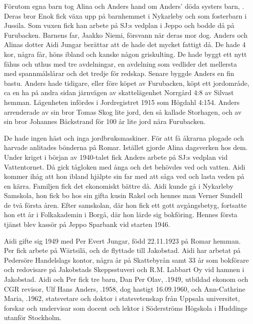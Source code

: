 Förutom egna barn tog Alina och Anders hand om Anders' döda systers barn, . Deras bror Enok fick växa upp på barnhemmet i Nykarleby och som fosterbarn i Jussila. Som vuxen fick han arbete på SJ:s vedplan i Jeppo och bodde då på Furubacken. Barnens far, Jaakko Niemi, försvann när deras mor dog. Anders och Alinas dotter Aidi Jungar berättar att de hade det mycket fattigt då. De hade 4 kor, några får, höns ibland och kanske någon griskulting. De hade byggt ett nytt fähus och uthus med tre avdelningar, en avdelning som 	vedlider det mellersta med spannmålslårar och det tredje för redskap. Senare byggde Anders en fin bastu. Anders hade tidigare, eller före köpet	av Furubacken, köpt ett jordområde, ca en ha på andra sidan järnvägen av skattelägenhet Norrgård 4:8 av Silvast hemman. Lägenheten infördes i Jordregistret 1915 som Högdahl 4:154. Anders arrenderade av sin bror Tomas Skog lite jord, den så kallade Storhagen, och av sin bror Johannes Bäckstrand för 100 år lite jord nära Furubacken.

De hade ingen häst och inga jordbruksmaskiner. För att få åkrarna plogade och harvade anlitades bönderna på Romar. Istället gjorde Alina dagsverken hos dem. Under kriget i början av 1940-talet fick Anders arbete på SJ:s vedplan vid Vattentornet. Då gick tågloken med 	ånga och det behövdes ved och vatten. Aidi kommer ihåg att hon ibland hjälpte sin far med att såga ved och lasta veden på en kärra. Familjen fick det ekonomiskt bättre då. Aidi 	kunde gå i Nykarleby Samskola, hon fick bo hos sin gifta kusin Rakel och hennes man Verner Sundell de två första åren. Efter samskolan, där hon fick ett gott avgångsbetyg, fortsatte hon ett år i Folkakademin i Borgå, där hon lärde sig bokföring. Hennes första tjänst blev kassör på Jeppo Sparbank vid starten 1946.


Aidi gifte sig 1949 med Per Evert Jungar, född 22.11.1923 på Romar hemman. Per fick arbete på Wärtsilä, och de flyttade till Jakobstad. Aidi har arbetat på Pedersöre Handelslags kontor, några år på Skattebyrån samt 33 år som bokförare och redovisare på Jakobstads Skeppsstuveri och R.M. Labbart Oy vid hamnen i Jakobstad. Aidi och Per fick tre barn, Dan Per Olav, .1949, utbildad ekonom och CGR revisor, Ulf Hans Anders, .1958, dog hastigt 16.09.1960, och Ann-Cathrine Maria, .1962, statsvetare och doktor i statsvetenskap från Uppsala universitet, forskar och undervisar som docent och lektor i Söderströms Högskola i Huddinge utanför Stockholm.


